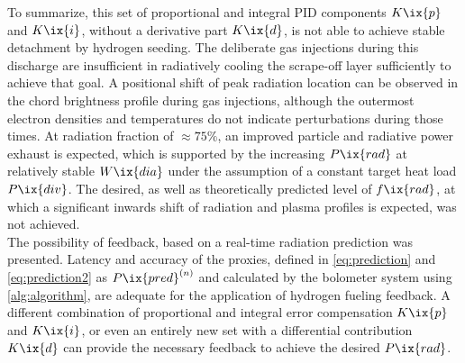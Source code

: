             To summarize, this set of proportional and integral PID components $K\ix{p}$ and $K\ix{i}$, without a derivative part $K\ix{d}$, is not able to achieve stable detachment by hydrogen seeding. The deliberate gas injections during this discharge are insufficient in radiatively cooling the scrape-off layer sufficiently to achieve that goal. A positional shift of peak radiation location can be observed in the chord brightness profile during gas injections, although the outermost electron densities and temperatures do not indicate perturbations during those times. At radiation fraction of $\approx75\%$, an improved particle and radiative power exhaust is expected, which is supported by the increasing $P\ix{rad}$ at relatively stable $W\ix{dia}$ under the assumption of a constant target heat load $P\ix{div}$. The desired, as well as theoretically predicted level of $f\ix{rad}$\cite{Feng2016}, at which a significant inwards shift of radiation and plasma profiles is expected, was not achieved.\\%
            The possibility of feedback, based on a real-time radiation prediction was presented. Latency and accuracy of the proxies, defined in \cref{eq:prediction} and \cref{eq:prediction2} as $P\ix{pred}^{\left(n\right)}$ and calculated by the bolometer system using \autoref{alg:algorithm}, are adequate for the application of hydrogen fueling feedback. A different combination of proportional and integral error compensation $K\ix{p}$ and $K\ix{i}$, or even an entirely new set with a differential contribution $K\ix{d}$ can provide the necessary feedback to achieve the desired $P\ix{rad}$.%
%
